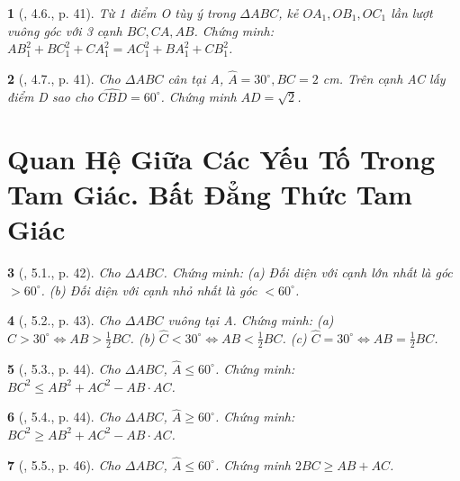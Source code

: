 \documentclass{article}
\newtheorem{baitoan}{}
\begin{document}
\begin{baitoan}[\cite{Hung_Mai_Toan_7_hinh_hoc}, 4.6., p. 41]
	Từ 1 điểm O tùy ý trong $\Delta ABC$, kẻ $OA_1,OB_1,OC_1$ lần lượt vuông góc với 3 cạnh $BC,CA,AB$. Chứng minh: $AB_1^2 + BC_1^2 + CA_1^2 = AC_1^2 + BA_1^2 + CB_1^2$.
\end{baitoan}

\begin{baitoan}[\cite{Hung_Mai_Toan_7_hinh_hoc}, 4.7., p. 41]
	Cho $\Delta ABC$ cân tại A, $\widehat{A} = 30^\circ,BC = 2$ {\rm cm}. Trên cạnh AC lấy điểm D sao cho $\widehat{CBD} = 60^\circ$. Chứng minh $AD = \sqrt{2}$.
\end{baitoan}


\section{Quan Hệ Giữa Các Yếu Tố Trong Tam Giác. Bất Đẳng Thức Tam Giác}

\begin{baitoan}[\cite{Hung_Mai_Toan_7_hinh_hoc}, 5.1., p. 42]
	Cho $\Delta ABC$. Chứng minh: (a) Đối diện với cạnh lớn nhất là góc $> 60^\circ$. (b) Đối diện với cạnh nhỏ nhất là góc $< 60^\circ$.
\end{baitoan}

\begin{baitoan}[\cite{Hung_Mai_Toan_7_hinh_hoc}, 5.2., p. 43]
	Cho $\Delta ABC$ vuông tại A. Chứng minh: (a) $\widehat{C} > 30^\circ\Leftrightarrow AB > \frac{1}{2}BC$. (b) $\widehat{C} < 30^\circ\Leftrightarrow AB < \frac{1}{2}BC$. (c) $\widehat{C} = 30^\circ\Leftrightarrow AB = \frac{1}{2}BC$.
\end{baitoan}

\begin{baitoan}[\cite{Hung_Mai_Toan_7_hinh_hoc}, 5.3., p. 44]
	Cho $\Delta ABC$, $\widehat{A}\le60^\circ$. Chứng minh: $BC^2\le AB^2 + AC^2 - AB\cdot AC$.
\end{baitoan}

\begin{baitoan}[\cite{Hung_Mai_Toan_7_hinh_hoc}, 5.4., p. 44]
	Cho $\Delta ABC$, $\widehat{A}\ge60^\circ$. Chứng minh: $BC^2\ge AB^2 + AC^2 - AB\cdot AC$.
\end{baitoan}

\begin{baitoan}[\cite{Hung_Mai_Toan_7_hinh_hoc}, 5.5., p. 46]
	Cho $\Delta ABC$, $\widehat{A}\le60^\circ$. Chứng minh $2BC\ge AB + AC$.
\end{baitoan}
\end{document}
